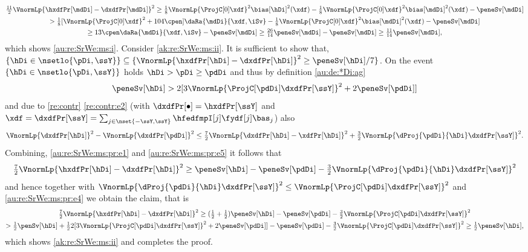 \begin{pro}
  \begin{multline*}
    \tfrac{11}{2}\VnormLp{\hxdfPr[\mdDi]-\dxdfPr[\mdDi]}^2\geq
    \tfrac{1}{8}\VnormLp{\ProjC[0]\xdf}^2\bias[\hDi]^2(\xdf)-
    \tfrac{1}{8}\VnormLp{\ProjC[0]\xdf}^2\bias[\mdDi]^2(\xdf)
    -\peneSv[\mdDi]\\
    >\tfrac{1}{8}[\VnormLp{\ProjC[0]\xdf}^2+104\cpen]\daRa{\mdDi}{\xdf,\iSv}
    -\tfrac{1}{8}\VnormLp{\ProjC[0]\xdf}^2\bias[\mdDi]^2(\xdf)-\peneSv[\mdDi]\\
    \geq 13\cpen \daRa{\mdDi}{\xdf,\iSv}-\peneSv[\mdDi]\geq\tfrac{26}{14}\peneSv[\mdDi]-\peneSv[\mdDi]  \geq\tfrac{11}{14}\peneSv[\mdDi],
  \end{multline*}
which  shows \ref{au:re:SrWe:ms:i}.  Consider \ref{ak:re:SrWe:ms:ii}. It is sufficient to show that,
  $\{\hDi\in\nsetlo{\pDi,\ssY}\}\subseteq
  \{\VnormLp{\hxdfPr[\hDi]-\dxdfPr[\hDi]}^2\geq\peneSv[\hDi]/7\}$.  On the
  event $\{\hDi\in\nsetlo{\pDi,\ssY}\}$ holds $\hDi>\pDi\geq\pdDi$ and
  thus by definition \eqref{au:de:*Di:ag}
  \begin{equation}\label{au:re:SrWe:ms:pr:e4}
    \peneSv[\hDi] > 2[3\VnormLp{\ProjC[\pdDi]\dxdfPr[\ssY]}^2+2\peneSv[\pdDi]]
  \end{equation}
  and due to   \cref{re:contr} \ref{re:contr:e2} 
(with
$\dxdfPr[\bullet]=\hxdfPr[\ssY]$
and
$\xdf=\dxdfPr[\ssY]=\sum_{j\in\nset{-\ssY,\ssY}}\hfedfmpI[j]\fydf[j]\bas_j$)
also
\begin{equation}\label{au:re:SrWe:ms:pr:e5}
  \VnormLp{\dxdfPr[\hDi]}^2-\VnormLp{\dxdfPr[\pdDi]}^2\leq
  \tfrac{7}{2}\VnormLp{\dxdfPr[\hDi]-\xdfPr[\hDi]}^2+\tfrac{3}{2}\VnormLp{\dProj{\pdDi}{\hDi}\dxdfPr[\ssY]}^2.
  \end{equation}
  Combining, \eqref{au:re:SrWe:ms:pr:e1} and \eqref{au:re:SrWe:ms:pr:e5} it
  follows that
  \begin{multline*}
    \tfrac{7}{2}\VnormLp{\hxdfPr[\hDi]-\dxdfPr[\hDi]}^2\geq
    \peneSv[\hDi]-\peneSv[\pdDi]  -\tfrac{3}{2}\VnormLp{\dProj{\pdDi}{\hDi}\dxdfPr[\ssY]}^2\hfill
  \end{multline*}
  and hence together with
  $\VnormLp{\dProj{\pdDi}{\hDi}\dxdfPr[\ssY]}^2\leq\VnormLp{\ProjC[\pdDi]\dxdfPr[\ssY]}^2$ and
  \eqref{au:re:SrWe:ms:pr:e4} we obtain the claim,
  that is
  \begin{multline*}
    \tfrac{7}{2}\VnormLp{\hxdfPr[\hDi]-\dxdfPr[\hDi]}^2\geq
    (\tfrac{1}{2}+\tfrac{1}{2})\peneSv[\hDi]-\peneSv[\pdDi]  -\tfrac{3}{2}\VnormLp{\ProjC[\pdDi]\dxdfPr[\ssY]}^2\\
    >\tfrac{1}{2}\penSv[\hDi]+\tfrac{1}{2}2[3\VnormLp{\ProjC[\pdDi]\dxdfPr[\ssY]}^2+2\peneSv[\pdDi]]-\peneSv[\pdDi]-\tfrac{3}{2}\VnormLp{\ProjC[\pdDi]\dxdfPr[\ssY]}^2
    \geq\tfrac{1}{2}\peneSv[\hDi],
  \end{multline*}
  which shows \ref{ak:re:SrWe:ms:ii} and completes the proof.\proEnd
\end{pro}
